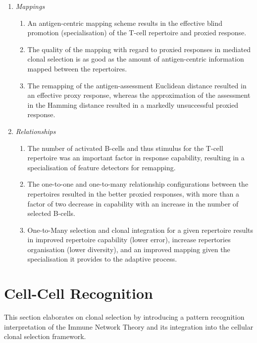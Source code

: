 \begin{enumerate}
	\item \emph{Mappings}
	\begin{enumerate}		
			\item An antigen-centric mapping scheme results in the effective blind promotion (specialisation) of the T-cell repertoire and proxied response.
		\item The quality of the mapping with regard to proxied responses in mediated clonal selection is as good as the amount of antigen-centric information mapped between the repertoires. 
		\item The remapping of the antigen-assessment Euclidean distance resulted in an effective proxy response, whereas the approximation of the assessment in the Hamming distance resulted in a markedly unsuccessful proxied response.
	\end{enumerate}
	
	\item \emph{Relationships}
	\begin{enumerate}
		\item The number of activated B-cells and thus stimulus for the T-cell repertoire was an important factor in response capability, resulting in a specialisation of feature detectors for remapping.
		\item The one-to-one and one-to-many relationship configurations between the repertoires resulted in the better proxied responses, with more than a factor of two decrease in capability with an increase in the number of selected B-cells.
		\item One-to-Many selection and clonal integration for a given repertoire results in improved repertoire capability (lower error), increase repertories organisation (lower diversity), and an improved mapping given the specialisation it provides to the adaptive process.
	\end{enumerate}	
\end{enumerate}



%
%
\section{Cell-Cell Recognition}
\label{sec:cells:network}
This section elaborates on clonal selection by introducing a pattern recognition interpretation of the Immune Network Theory and its integration into the cellular clonal selection framework.


